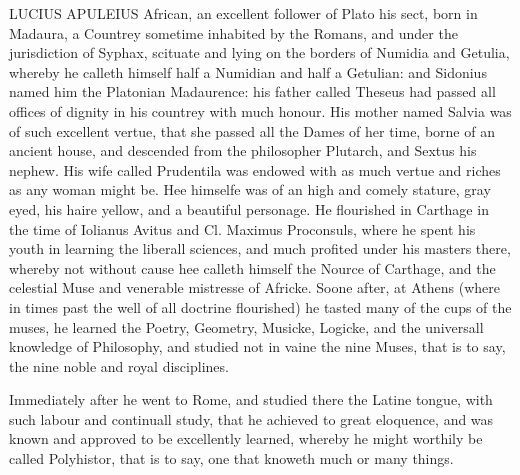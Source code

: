 LUCIUS APULEIUS African, an excellent follower of Plato his sect, born in
Madaura, a Countrey sometime inhabited by the Romans, and under the
jurisdiction of Syphax, scituate and lying on the borders of Numidia and
Getulia, whereby he calleth himself half a Numidian and half a Getulian: and
Sidonius named him the Platonian Madaurence: his father called Theseus had
passed all offices of dignity in his countrey with much honour. His mother
named Salvia was of such excellent vertue, that she passed all the Dames of her
time, borne of an ancient house, and descended from the philosopher Plutarch,
and Sextus his nephew. His wife called Prudentila was endowed with as much
vertue and riches as any woman might be. Hee himselfe was of an high and comely
stature, gray eyed, his haire yellow, and a beautiful personage. He flourished
in Carthage in the time of Iolianus Avitus and Cl. Maximus Proconsuls, where he
spent his youth in learning the liberall sciences, and much profited under his
masters there, whereby not without cause hee calleth himself the Nource of
Carthage, and the celestial Muse and venerable mistresse of Africke. Soone
after, at Athens (where in times past the well of all doctrine flourished) he
tasted many of the cups of the muses, he learned the Poetry, Geometry, Musicke,
Logicke, and the universall knowledge of Philosophy, and studied not in vaine
the nine Muses, that is to say, the nine noble and royal disciplines.

Immediately after he went to Rome, and studied there the Latine tongue, with
such labour and continuall study, that he achieved to great eloquence, and was
known and approved to be excellently learned, whereby he might worthily be
called Polyhistor, that is to say, one that knoweth much or many things.

